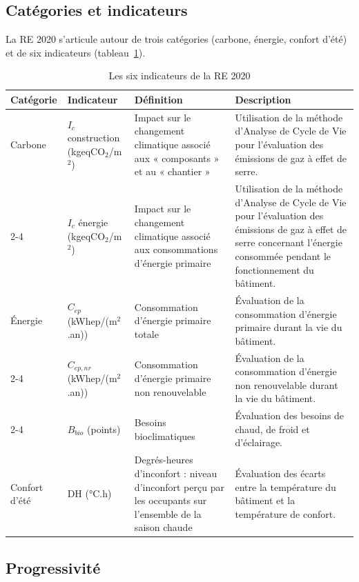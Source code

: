 \subsection*{Catégories et indicateurs}

La RE 2020 s'articule autour de trois catégories (carbone, énergie, confort d'été) et de six indicateurs (tableau~\ref{tab:re2020-indicateurs}).

\begin{table}[htbp]
\centering
\caption{Les six indicateurs de la RE 2020}

\small
\renewcommand{\arraystretch}{1.25}
\begin{tabular}{p{1.6cm}p{2.6cm}p{3.8cm}p{6cm}}
\textbf{Catégorie} & \textbf{Indicateur} & \textbf{Définition} & \textbf{Description} \\
\hline
Carbone & $I_c$ construction (kgeqCO$_2$/m$^2$) & Impact sur le changement climatique associé aux « composants » et au « chantier » & Utilisation de la méthode d'Analyse de Cycle de Vie pour l'évaluation des émissions de gaz à effet de serre. \\
\cline{2-4}
 & $I_c$ énergie (kgeqCO$_2$/m$^2$) & Impact sur le changement climatique associé aux consommations d'énergie primaire & Utilisation de la méthode d'Analyse de Cycle de Vie pour l'évaluation des émissions de gaz à effet de serre concernant l'énergie consommée pendant le fonctionnement du bâtiment. \\
\hline
Énergie & $C_{ep}$ (kWhep/(m$^2$.an)) & Consommation d'énergie primaire totale & Évaluation de la consommation d'énergie primaire durant la vie du bâtiment. \\
\cline{2-4}
 & $C_{ep,nr}$ (kWhep/(m$^2$.an)) & Consommation d'énergie primaire non renouvelable & Évaluation de la consommation d'énergie non renouvelable durant la vie du bâtiment. \\
\cline{2-4}
 & $B_{bio}$ (points) & Besoins bioclimatiques & Évaluation des besoins de chaud, de froid et d'éclairage. \\
\hline
Confort d'été & DH (°C.h) & Degrés-heures d'inconfort : niveau d'inconfort perçu par les occupants sur l'ensemble de la saison chaude & Évaluation des écarts entre la température du bâtiment et la température de confort. \\
\hline
\end{tabular}
\label{tab:re2020-indicateurs}
\end{table}


\subsection*{Progressivité}

